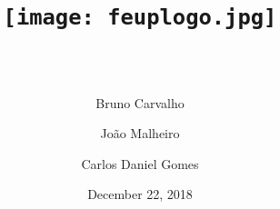 \documentclass[11pt,a4paper,portrait,titlepage]{article}
\title{
	\texttt{[image: feuplogo.jpg]}\\
	{\Huge \maintitle{}}\\
	{\large \subtitle{}}
}
\date{December 22, 2018}
\author{
	Bruno Carvalho\\\text{up201606517}
	\and
	João Malheiro\\\text{up201605926}
	\and
	Carlos Daniel Gomes\\\text{up201603404}
}
\begin{document}
\begin{titlepage}
\maketitle
\tableofcontents
\thispagestyle{empty}
\end{titlepage}


\clearpage


\clearpage

\end{document}
